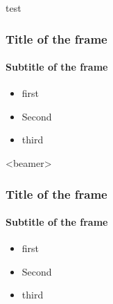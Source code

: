 \documentclass[11pt]{article}
\begin{document}
test

\begin{frame}
    \frametitle{Title of the frame}
    \framesubtitle{Subtitle of the frame}

    \begin{itemize}[<+->]
        \item first
        \item Second
        \item third
    \end{itemize}

\end{frame}

\begin{frame}<beamer>
    \frametitle{Title of the frame}
    \framesubtitle{Subtitle of the frame}

    \begin{itemize}[<+->]
        \item first
        \item Second
        \item third
    \end{itemize}

\end{frame}
\end{document}
